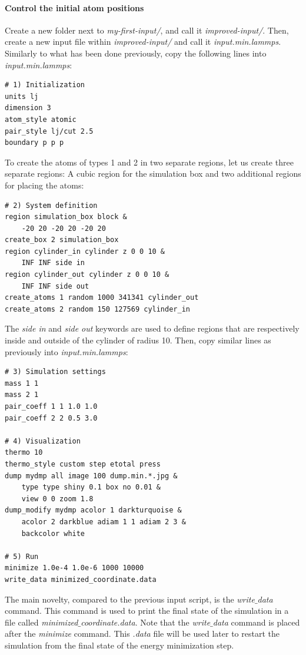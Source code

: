 \documentclass[9pt,tutorial]{livecoms}
\begin{document}
\paragraph{Control the initial atom positions}
\noindent Create a new folder next to \textit{my-first-input/}, and call it \textit{improved-input/}. Then, create a new input file within \textit{improved-input/} and call it \textit{input.min.lammps}. Similarly to what has been done previously, copy the following lines into \textit{input.min.lammps}:
{\normalsize \begin{verbatim}
# 1) Initialization
units lj
dimension 3
atom_style atomic
pair_style lj/cut 2.5
boundary p p p
\end{verbatim}}
To create the atoms of types 1 and 2 in two separate regions, let us create three separate regions: A cubic region for the simulation box and two additional regions for placing the atoms:
{\normalsize \begin{verbatim}
# 2) System definition
region simulation_box block &
    -20 20 -20 20 -20 20
create_box 2 simulation_box
region cylinder_in cylinder z 0 0 10 &
    INF INF side in
region cylinder_out cylinder z 0 0 10 &
    INF INF side out
create_atoms 1 random 1000 341341 cylinder_out
create_atoms 2 random 150 127569 cylinder_in
\end{verbatim}}
The \textit{side in} and \textit{side out} keywords are used to define regions that are respectively inside and outside of the cylinder of radius 10. Then, copy similar lines as previously into \textit{input.min.lammps}:
{\normalsize \begin{verbatim}
# 3) Simulation settings
mass 1 1
mass 2 1
pair_coeff 1 1 1.0 1.0
pair_coeff 2 2 0.5 3.0

# 4) Visualization
thermo 10
thermo_style custom step etotal press
dump mydmp all image 100 dump.min.*.jpg &
    type type shiny 0.1 box no 0.01 &
    view 0 0 zoom 1.8
dump_modify mydmp acolor 1 darkturquoise &
    acolor 2 darkblue adiam 1 1 adiam 2 3 &
    backcolor white

# 5) Run
minimize 1.0e-4 1.0e-6 1000 10000
write_data minimized_coordinate.data
\end{verbatim}}
The main novelty, compared to the previous input script, is the \textit{write$\_$data} command. This command is used to print the final state of the simulation in a file called \textit{minimized$\_$coordinate.data}. Note that the \textit{write$\_$data} command is placed after the \textit{minimize} command. This \textit{.data} file will be used later to restart the simulation from the final state of the energy minimization step.
\end{document}
